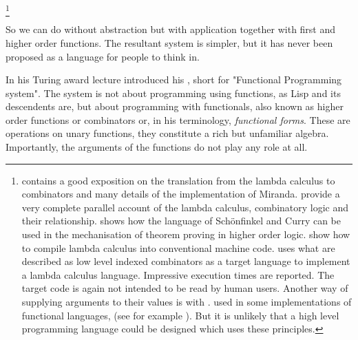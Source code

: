\footnote{
contains a good exposition on the translation
from the lambda calculus to combinators
and many details of the implementation of Miranda.
provide a very complete parallel account
of the lambda calculus, combinatory logic and their relationship.
shows how the language of Sch\"{o}nfinkel and Curry
can be used in the mechanisation
of theorem proving in higher order logic.
show how to compile lambda calculus into conventional machine code.
uses what are described as low level indexed combinators
as a target language to implement a lambda calculus language.
Impressive execution times are reported.
The target code is again not intended to be read by human users.
Another way of supplying arguments to their values is with
.
used in some implementations of functional languages,
(see for example
).
But it is unlikely that a high level programming
language could be designed which uses these principles.
}
\par
So we can do without abstraction but with application together
with first and higher order functions.
The resultant system is simpler,
but it has never been proposed as a language for people to think in.
\par
In his Turing award lecture
introduced his ,
short for "Functional Programming system".
The system is not about programming using functions,
as Lisp and its descendents are,
but about programming with functionals,
also known as higher order functions or
combinators or, in his terminology, {\em functional forms}.
These are operations on unary functions,
they constitute a rich but unfamiliar algebra.
Importantly, the arguments of the functions
do not play any role at all.
